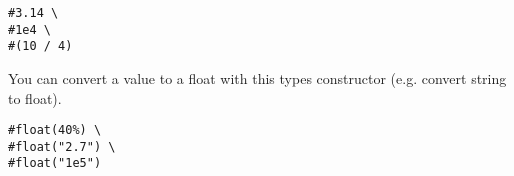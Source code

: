 \pandocbounded{}

\begin{verbatim}
#3.14 \
#1e4 \
#(10 / 4)
\end{verbatim}

\pandocbounded{}

You can convert a value to a float with this type\textquotesingle s
constructor (e.g. convert string to float).

\begin{verbatim}
#float(40%) \
#float("2.7") \
#float("1e5")
\end{verbatim}

\pandocbounded{}


